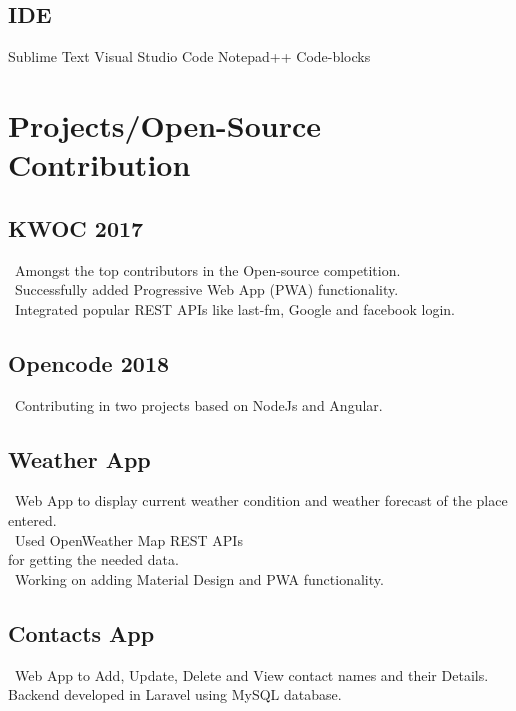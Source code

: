 \documentclass[]{deedy-resume-openfont}
\begin{document}
\begin{minipage}[t]{0.33\textwidth}
\sectionsep

\subsection{IDE}
Sublime Text \textbullet{} Visual Studio Code \newline \textbullet{} Notepad++ \textbullet{} Code-blocks  

\sectionsep

\section{Projects/Open-Source Contribution}

\subsection{KWOC 2017}
\textbullet\  Amongst the top contributors in the Open-source competition.\\
\textbullet\ Successfully added Progressive Web App (PWA) functionality.\\
\textbullet\ Integrated popular REST APIs like last-fm, Google and facebook login.
\sectionsep

\subsection{Opencode 2018}
\textbullet\ Contributing in two projects based on NodeJs and Angular.\\
\sectionsep

\subsection{Weather App}
\textbullet\  Web App to display current weather condition and weather forecast of the place entered.\\
\textbullet\ Used OpenWeather Map REST APIs \\for getting the needed data.\\
\textbullet\ Working on adding Material Design and PWA functionality.
\sectionsep

\subsection{Contacts App }
\textbullet\  Web App to Add, Update, Delete and View contact names and their Details. Backend developed in Laravel using MySQL database.\\
\sectionsep


\end{minipage}
\end{document}
